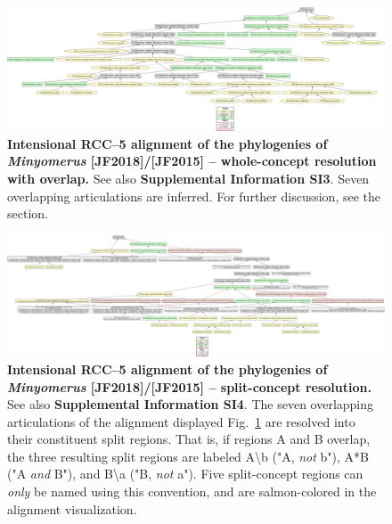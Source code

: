 \documentclass[fleqn,10pt,lineno]{wlpeerj} %
\begin{document}
\begin{figure}[h]
	\centering
	\includegraphics[width=\textwidth]{align2.jpg}
	\caption{\textbf{Intensional RCC--5 alignment of the phylogenies of \textit{Minyomerus} [JF2018]/[JF2015] -- whole-concept resolution with overlap.} See also \textbf{Supplemental Information SI3}. Seven overlapping articulations are inferred. For further discussion, see the \textbf{} section.}
	\label{fig:align2}
\end{figure}

\begin{figure}[h]
	\centering
	\includegraphics[width=\textwidth]{align3.jpg}
	\caption{\textbf{Intensional RCC--5 alignment of the phylogenies of \textit{Minyomerus} [JF2018]/[JF2015] -- split-concept resolution.} See also \textbf{Supplemental Information SI4}. The seven overlapping articulations of the alignment displayed Fig.~\ref{fig:align2} are resolved into their constituent split regions. That is, if regions A and B overlap, the three resulting split regions are labeled A\textbackslash b ("A, \emph{not} b"), A*B ("A \emph{and} B"), and B\textbackslash a ("B, \emph{not} a"). Five split-concept regions can \emph{only} be named using this convention, and are salmon-colored in the alignment visualization.}
	\label{fig:align3}
\end{figure}
\end{document}
